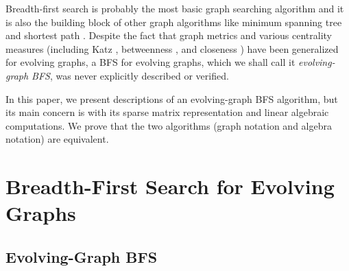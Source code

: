 \documentclass[11pt, conference, , compsocconf]{IEEEtran}
\theoremstyle{definition}
\begin{document}
Breadth-first search is probably the most basic graph searching algorithm and 
it is also the building block of other graph algorithms like minimum spanning tree 
and shortest path \cite{ckrs09}.
Despite the fact that graph metrics \cite{ntmm13} \cite{tmml09} \cite{tsmm09} and 
various centrality measures (including Katz  \cite{gphe11} \cite{grihig13}, 
betweenness \cite{alhi15}, and closeness  \cite{tmml10}) 
have been generalized for evolving graphs,
a BFS for evolving graphs, which we shall call it \emph{evolving-graph BFS},
was never explicitly described or verified.


In this paper,  we present descriptions of an evolving-graph BFS algorithm, but its main concern is with its sparse matrix
representation and linear algebraic computations. 
We prove that the two algorithms (graph notation and algebra notation) are equivalent.  



\section{Breadth-First Search for Evolving Graphs}
\label{sec:breadth-first-search}

\subsection{Evolving-Graph BFS}
\label{sec:evolving-graph-bfs}
\end{document}

